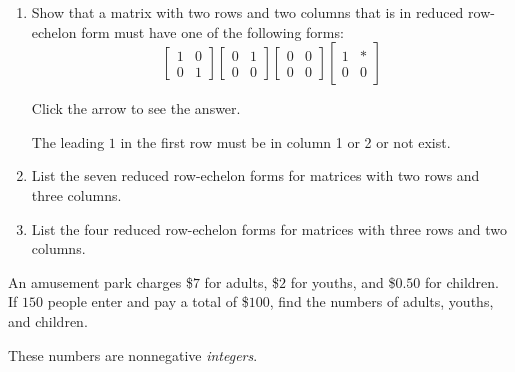\documentclass{ximera}
\begin{document}
\begin{problem}\label{prb:2x2rref_forms}

\begin{enumerate}
\item Show that a matrix with two rows and two columns that is in reduced row-echelon form must have one of the following forms:
\begin{equation*}
\begin{bmatrix}
1 & 0 \\
0 & 1
\end{bmatrix}
\begin{bmatrix}
0 & 1 \\
0 & 0
\end{bmatrix}
\begin{bmatrix}
0 & 0 \\
0 & 0
\end{bmatrix}
\begin{bmatrix}
1 & * \\
0 & 0
\end{bmatrix}
\end{equation*}

Click the arrow to see the answer. 
\begin{expandable}
 The leading $1$ in the first row must be in column 1 or 2 or not exist.
\end{expandable}

\item List the seven reduced row-echelon forms for matrices with two rows and three columns.

\item List the four reduced row-echelon forms for matrices with three rows and two columns.

\end{enumerate}
\end{problem}

\begin{problem}\label{prb:amusement}
An amusement park charges \$$7$ for adults, \$$2$ for youths, and \$$0.50$ for
children. If $150$ people enter and pay a total of \$$100$, find the numbers
of adults, youths, and children.

\begin{hint}
These numbers are nonnegative \textit{integers}.
\end{hint}

\end{problem}
\end{document}
